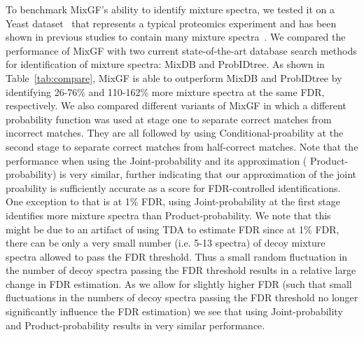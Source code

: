 \documentclass[runningheads,a4paper]{llncs}
\begin{document}
To benchmark MixGF's ability to identify mixture spectra, we tested it on a Yeast dataset~\cite{li2009} that represents a typical proteomics experiment and has been shown in previous studies to contain many mixture spectra~\cite{wang2010msplit}.  We compared the performance of MixGF with two current state-of-the-art database search methods for identification of mixture spectra: MixDB and ProbIDtree. As shown in Table~\ref{tab:compare}, MixGF is able to outperform MixDB and ProbIDtree by identifying 26-76\% and 110-162\%
more mixture spectra at the same FDR, respectively.  We also compared different variants of MixGF in which a different probability function was used at stage one to separate correct matches from incorrect matches.  They are all followed by using Conditional-proability at the second stage to separate correct matches from half-correct matches.  Note that the performance when using the Joint-probability and its approximation ( Product-probability) is very similar, further indicating that our approximation of the joint proability is sufficiently accurate as a score for FDR-controlled identifications.  One exception to that is at 1\% FDR, using Joint-probability at the first stage identifies more mixture spectra than Product-probability. We note that this might be due to an artifact of using TDA to estimate FDR since at 1\% FDR, there can be only a very small number (i.e. 5-13 spectra) of decoy mixture spectra allowed to pass the FDR threshold.  Thus a small random fluctuation in the number of decoy spectra passing the FDR threshold results in a relative large change in FDR estimation.  As we allow for slightly higher FDR (such that small fluctuations in the numbers of decoy spectra passing the FDR threshold no longer significantly influence the FDR estimation) we see that using Joint-probability and Product-probability results in very similar performance.
\vspace{-3mm}
\end{document}
